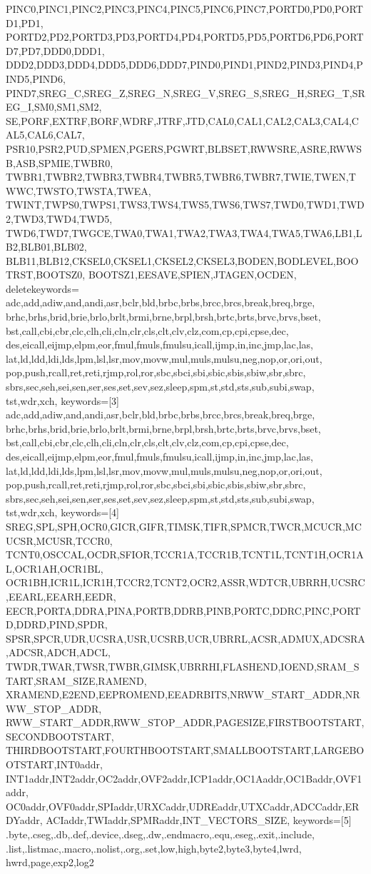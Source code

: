 {{    PINC0,PINC1,PINC2,PINC3,PINC4,PINC5,PINC6,PINC7,PORTD0,PD0,PORTD1,PD1,
    PORTD2,PD2,PORTD3,PD3,PORTD4,PD4,PORTD5,PD5,PORTD6,PD6,PORTD7,PD7,DDD0,DDD1,
    DDD2,DDD3,DDD4,DDD5,DDD6,DDD7,PIND0,PIND1,PIND2,PIND3,PIND4,PIND5,PIND6,
    PIND7,SREG_C,SREG_Z,SREG_N,SREG_V,SREG_S,SREG_H,SREG_T,SREG_I,SM0,SM1,SM2,
    SE,PORF,EXTRF,BORF,WDRF,JTRF,JTD,CAL0,CAL1,CAL2,CAL3,CAL4,CAL5,CAL6,CAL7,
    PSR10,PSR2,PUD,SPMEN,PGERS,PGWRT,BLBSET,RWWSRE,ASRE,RWWSB,ASB,SPMIE,TWBR0,
    TWBR1,TWBR2,TWBR3,TWBR4,TWBR5,TWBR6,TWBR7,TWIE,TWEN,TWWC,TWSTO,TWSTA,TWEA,
    TWINT,TWPS0,TWPS1,TWS3,TWS4,TWS5,TWS6,TWS7,TWD0,TWD1,TWD2,TWD3,TWD4,TWD5,
    TWD6,TWD7,TWGCE,TWA0,TWA1,TWA2,TWA3,TWA4,TWA5,TWA6,LB1,LB2,BLB01,BLB02,
    BLB11,BLB12,CKSEL0,CKSEL1,CKSEL2,CKSEL3,BODEN,BODLEVEL,BOOTRST,BOOTSZ0,
    BOOTSZ1,EESAVE,SPIEN,JTAGEN,OCDEN},
    deletekeywords=
    {adc,add,adiw,and,andi,asr,bclr,bld,brbc,brbs,brcc,brcs,break,breq,brge,
    brhc,brhs,brid,brie,brlo,brlt,brmi,brne,brpl,brsh,brtc,brts,brvc,brvs,bset,
    bst,call,cbi,cbr,clc,clh,cli,cln,clr,cls,clt,clv,clz,com,cp,cpi,cpse,dec,
    des,eicall,eijmp,elpm,eor,fmul,fmuls,fmulsu,icall,ijmp,in,inc,jmp,lac,las,
    lat,ld,ldd,ldi,lds,lpm,lsl,lsr,mov,movw,mul,muls,mulsu,neg,nop,or,ori,out,
    pop,push,rcall,ret,reti,rjmp,rol,ror,sbc,sbci,sbi,sbic,sbis,sbiw,sbr,sbrc,
    sbrs,sec,seh,sei,sen,ser,ses,set,sev,sez,sleep,spm,st,std,sts,sub,subi,swap,
    tst,wdr,xch},
    keywords=[3]
    {adc,add,adiw,and,andi,asr,bclr,bld,brbc,brbs,brcc,brcs,break,breq,brge,
    brhc,brhs,brid,brie,brlo,brlt,brmi,brne,brpl,brsh,brtc,brts,brvc,brvs,bset,
    bst,call,cbi,cbr,clc,clh,cli,cln,clr,cls,clt,clv,clz,com,cp,cpi,cpse,dec,
    des,eicall,eijmp,elpm,eor,fmul,fmuls,fmulsu,icall,ijmp,in,inc,jmp,lac,las,
    lat,ld,ldd,ldi,lds,lpm,lsl,lsr,mov,movw,mul,muls,mulsu,neg,nop,or,ori,out,
    pop,push,rcall,ret,reti,rjmp,rol,ror,sbc,sbci,sbi,sbic,sbis,sbiw,sbr,sbrc,
    sbrs,sec,seh,sei,sen,ser,ses,set,sev,sez,sleep,spm,st,std,sts,sub,subi,swap,
    tst,wdr,xch},
    keywords=[4]
    {SREG,SPL,SPH,OCR0,GICR,GIFR,TIMSK,TIFR,SPMCR,TWCR,MCUCR,MCUCSR,MCUSR,TCCR0,
    TCNT0,OSCCAL,OCDR,SFIOR,TCCR1A,TCCR1B,TCNT1L,TCNT1H,OCR1AL,OCR1AH,OCR1BL,
    OCR1BH,ICR1L,ICR1H,TCCR2,TCNT2,OCR2,ASSR,WDTCR,UBRRH,UCSRC,EEARL,EEARH,EEDR,
    EECR,PORTA,DDRA,PINA,PORTB,DDRB,PINB,PORTC,DDRC,PINC,PORTD,DDRD,PIND,SPDR,
    SPSR,SPCR,UDR,UCSRA,USR,UCSRB,UCR,UBRRL,ACSR,ADMUX,ADCSRA,ADCSR,ADCH,ADCL,
    TWDR,TWAR,TWSR,TWBR,GIMSK,UBRRHI,FLASHEND,IOEND,SRAM_START,SRAM_SIZE,RAMEND,
    XRAMEND,E2END,EEPROMEND,EEADRBITS,NRWW_START_ADDR,NRWW_STOP_ADDR,
    RWW_START_ADDR,RWW_STOP_ADDR,PAGESIZE,FIRSTBOOTSTART,SECONDBOOTSTART,
    THIRDBOOTSTART,FOURTHBOOTSTART,SMALLBOOTSTART,LARGEBOOTSTART,INT0addr,
    INT1addr,INT2addr,OC2addr,OVF2addr,ICP1addr,OC1Aaddr,OC1Baddr,OVF1addr,
    OC0addr,OVF0addr,SPIaddr,URXCaddr,UDREaddr,UTXCaddr,ADCCaddr,ERDYaddr,
    ACIaddr,TWIaddr,SPMRaddr,INT_VECTORS_SIZE},
    keywords=[5]
    {.byte,.cseg,.db,.def,.device,.dseg,.dw,.endmacro,.equ,.eseg,.exit,.include,
    .list,.listmac,.macro,.nolist,.org,.set,low,high,byte2,byte3,byte4,lwrd,
    hwrd,page,exp2,log2}
}

